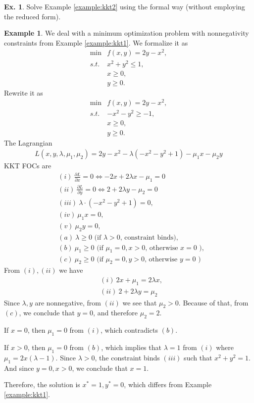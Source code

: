 \documentclass[10pt,a4paper]{book}
\theoremstyle{definition}\newtheorem{definition}{Definition}
\theoremstyle{definition}\newtheorem{fact}{Fact}
\theoremstyle{definition}\newtheorem{ex}{Ex.}
\theoremstyle{definition}\newtheorem{project}{Project}
\theoremstyle{definition}\newtheorem{problem}{Problem}
\theoremstyle{definition}\newtheorem{example}{Example}
\numberwithin{theorem}{chapter}
\numberwithin{corollary}{chapter}
\numberwithin{assumption}{chapter}
\numberwithin{definition}{chapter}
\numberwithin{prop}{chapter}
\numberwithin{notation}{chapter}
\numberwithin{problem}{chapter}
\numberwithin{example}{chapter}
\numberwithin{fact}{chapter}
\numberwithin{ex}{chapter}
\begin{document}
	\begin{ex}
		Solve Example \ref{example:kkt2} using the formal way (without employing the reduced form).
	\end{ex}
	
	\begin{example}
		We deal with a minimum optimization problem with nonnegativity constraints from Example \ref{example:kkt1}. We formalize it as
		\begin{align*}
			\min &f(x,y) = 2 y - x^2, \\
			s.t. & x^2 + y^2 \leq 1, \\
			& x \geq 0, \\
			& y \geq 0.
		\end{align*}
		Rewrite it as 
		\begin{align*}
			\min &f(x,y) = 2 y - x^2, \\
			s.t. & -x^2 - y^2 \geq -1, \\
			& x \geq 0, \\
			& y \geq 0.
		\end{align*}
		The Lagrangian 
		\begin{align*}
			L(x,y,\lambda,\mu_1,\mu_2) = 2 y - x^2 - \lambda (-x^2 - y^2 + 1) - \mu_1 x - \mu_2 y
		\end{align*}
		KKT FOCs are
	\begin{align*}
		&(i) \ \frac{\partial L}{\partial x} = 0 \iff -2x + 2\lambda x - \mu_1= 0 \\
		&(ii) \ \frac{\partial L}{\partial y} = 0 \iff 2 + 2\lambda y - \mu_2= 0 \\
		&(iii) \ \lambda \cdot (- x^2 - y^2  +1) = 0, \\
		&(iv) \ \mu_1 x = 0, \\
		&(v) \ \mu_2 y = 0, \\
		&(a) \ \lambda \geq 0  \text{ (if $\lambda > 0$, constraint binds)}, \\
		&(b) \ \mu_1 \geq 0 \text{ (if $\mu_1 = 0, x > 0$, otherwise $x=0$ )}, \\
		&(c) \ \mu_2 \geq 0 \text{ (if $\mu_2 = 0, y > 0$, otherwise $y=0$ )}
	\end{align*}
	From $(i), (ii)$ we have
	\begin{align*}
		&(i) \ 2x + \mu_1 = 2\lambda x, \\
		&(ii) \ 2 + 2\lambda y = \mu_2
	\end{align*}
	Since $\lambda, y$ are nonnegative, from $(ii)$ we see that $\mu_2 > 0$. Because of that, from $(c)$, we conclude that $y=0$, and therefore $\mu_2=2$.
	
	If $x=0$, then $\mu_1 = 0$ from $(i)$, which contradicts $(b)$.
	
	If $x>0$, then $\mu_1 = 0$ from $(b)$, which implies that $\lambda = 1$ from $(i)$ where $\mu_1 = 2x(\lambda-1)$. Since $\lambda > 0$, the constraint binds $(iii)$ such that $x^2 + y^2 = 1$. And since $y=0, x > 0$, we conclude that $x=1$.
	
	Therefore, the solution is $x^* = 1, y^* = 0$, which differs from Example \ref{example:kkt1}.
	\end{example}
	
\end{document}
